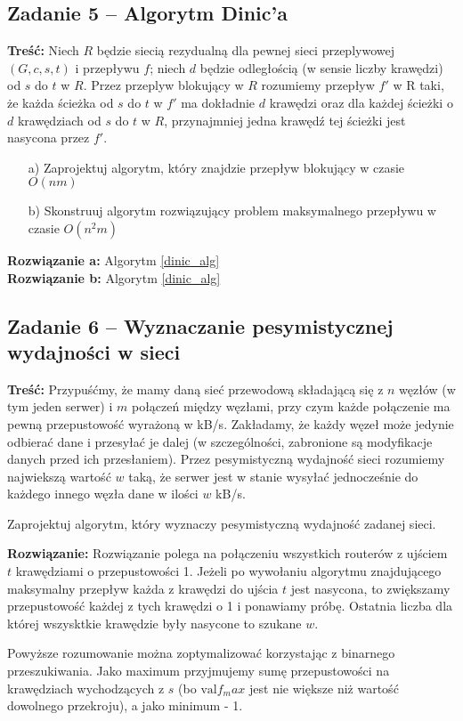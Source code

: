 \subsection{Zadanie 5 -- Algorytm Dinic'a}
\textbf{Treść: } Niech $R$ będzie siecią rezydualną 
dla pewnej sieci przeplywowej $(G, c, s, t)$ i przepływu $f$; 
niech $d$ będzie
odległością (w sensie liczby krawędzi) od $s$ do $t$ w $R$. 
Przez przeplyw blokujący w $R$ rozumiemy przepływ $f'$ w R taki,
że każda ścieżka od $s$ do $t$ w $f'$ ma dokładnie 
$d$ krawędzi oraz dla każdej ścieżki o $d$ krawędziach od $s$ do $t$ w $R$,
przynajmniej jedna krawędź tej ścieżki jest nasycona przez $f'$.
\begin{itemize}
	\item[a)] Zaprojektuj algorytm, który znajdzie przepływ blokujący w czasie $O(nm)$
	\item[b)] Skonstruuj algorytm rozwiązujący problem maksymalnego przepływu w czasie $O(n^2m)$
\end{itemize}
\textbf{Rozwiązanie a: } Algorytm \ref{dinic_alg} \\ 
\textbf{Rozwiązanie b: } Algorytm \ref{dinic_alg}

\subsection{Zadanie 6 -- Wyznaczanie pesymistycznej wydajności w sieci}
\textbf{Treść: } Przypuśćmy, że mamy daną sieć przewodową składającą 
się z $n$ węzłów (w tym jeden serwer) i $m$
połączeń między węzłami, przy czym każde połączenie ma pewną 
przepustowość wyrażoną w kB/s. Zakładamy, że
każdy węzeł może jedynie odbierać dane i przesyłać je 
dalej (w szczególności, zabronione są modyfikacje danych przed
ich przesłaniem). Przez pesymistyczną wydajność sieci 
rozumiemy najwiekszą wartość $w$ taką, że serwer jest w stanie
wysyłać jednocześnie do każdego innego węzła dane w ilości $w$ kB/s.

Zaprojektuj algorytm, który wyznaczy pesymistyczną wydajność zadanej sieci.

\textbf{Rozwiązanie: }
Rozwiązanie polega na połączeniu wszystkich routerów z ujściem $t$ krawędziami 
o przepustowości 1. Jeżeli po wywołaniu algorytmu znajdującego maksymalny
przepływ każda z krawędzi do ujścia $t$ jest nasycona, to 
zwiększamy przepustowość każdej z tych krawędzi o 1 i ponawiamy próbę.
Ostatnia liczba dla której wszysktkie krawędzie były nasycone to 
szukane $w$.


Powyższe rozumowanie można zoptymalizować korzystając z 
binarnego przeszukiwania. Jako maximum przyjmujemy
sumę przepustowości na krawędziach
wychodzących z $s$ 
(bo $\text{val} f_max$ jest nie większe niż
wartość dowolnego przekroju), a jako minimum - 1.

